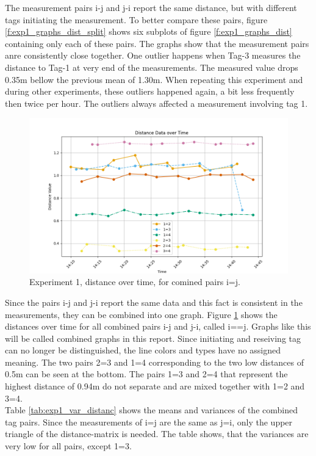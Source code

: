 The measurement pairs i-j and j-i report the same distance, but with different tags initiating the measurement. 
To better compare these pairs, figure \ref{f:exp1_graphs_dist_split} shows six subplots of figure \ref{f:exp1_graphs_dist} containing only each of these pairs.
The graphs show that the measurement pairs anre consistently close together.
One outlier happens when Tag-3 measures the distance to Tag-1 at very end of the measurements.
The measured value drops 0.35m bellow the previous mean of 1.30m.
When repeating this experiment and during other experiments, these outliers happened again, a bit less frequently then twice per hour.
The outliers always affected a measurement involving tag 1.

\begin{figure}[ht!]
	\includegraphics[width=\linewidth]{graphics/exp/exp1_dist_data_plot_1_combined.png}
	\caption{Experiment 1, distance over time, for comined pairs i=j.}
	\label{f:exp1_graphs_dist_combined}
\end{figure}

Since the pairs i-j and j-i report the same data and this fact is consistent in the measurements, they can be combined into one graph.
Figure \ref{f:exp1_graphs_dist_combined} shows the distances over time for all combined pairs i-j and j-i, called i==j.
Graphs like this will be called combined graphs in this report.
Since initiating and reseiving tag can no longer be distinguished, the line colors and types have no assigned meaning.
The two pairs 2=3 and 1=4 corresponding to the two low distances of 0.5m can be seen at the bottom.
The pairs 1=3 and 2=4 that represent the highest distance of 0.94m do not separate and are mixed together with 1=2 and 3=4.\\
Table \ref{tab:exp1_var_distanc} shows the means and variances of the combined tag pairs.
Since the measurements of i=j are the same as j=i, only the upper triangle of the distance-matrix is needed.
The table shows, that the variances are very low for all pairs, except 1=3.

